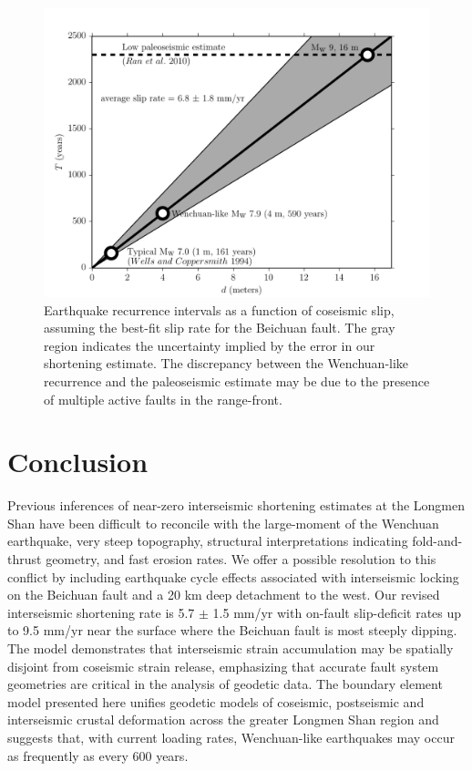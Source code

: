 \documentclass[12pt]{article}
\begin{document}
\begin{figure}[h!]
    \centering
    \includegraphics{figs/hazard_all_details.pdf}
    \caption{Earthquake recurrence intervals as a function of coseismic slip, assuming the best-fit slip rate for the Beichuan fault. The gray region indicates the uncertainty implied by the error in our shortening estimate. The discrepancy between the Wenchuan-like recurrence and the paleoseismic estimate may be due to the presence of multiple active faults in the range-front.}
    \label{fig:hazard}
\end{figure}

\section{Conclusion}
Previous inferences of near-zero interseismic shortening estimates at the Longmen Shan have been difficult to reconcile with the large-moment of the Wenchuan earthquake, very steep topography, structural interpretations indicating fold-and-thrust geometry, and fast erosion rates. We offer a possible resolution to this conflict by including earthquake cycle effects associated with interseismic locking on the Beichuan fault and a 20 km deep detachment to the west. Our revised interseismic shortening rate is 5.7 $\pm$ 1.5 mm/yr with on-fault slip-deficit rates up to 9.5 mm/yr near the surface where the Beichuan fault is most steeply dipping. The model demonstrates that interseismic strain accumulation may be spatially disjoint from coseismic strain release, emphasizing that accurate fault system geometries are critical in the analysis of geodetic data. The boundary element model presented here unifies geodetic models of coseismic, postseismic and interseismic crustal deformation across the greater Longmen Shan region and suggests that, with current loading rates, Wenchuan-like earthquakes may occur as frequently as every 600 years.



\end{document}
